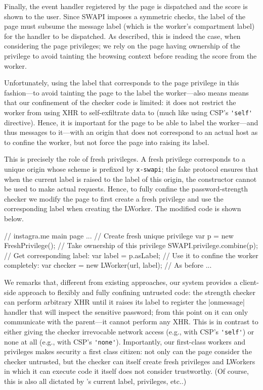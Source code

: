 Finally, the event handler registered by the page is dispatched and
the score is shown to the user.
%
Since SWAPI imposes a symmetric checks, the label of the page must
subsume the message label (which is the worker's compartment label)
for the handler to be dispatched.
%
As described, this is indeed the case, when considering the page
privileges;
%
we rely on the page having ownership of the 
privilege to avoid tainting the browsing context before reading the
score from the worker.

%
Unfortunately, using the label that corresponds to the page privilege
in this fashion---to avoid tainting the page to the label the
worker---also means means that our confinement of the checker code is
limited: it does not restrict the worker from using XHR to
self-exfiltrate data to  (much like using CSP's
\verb|'self'| directive).
%
Hence, it is important for the page to be able to label the
worker---and thus messages to it---with an origin that does not
correspond to an actual host as to confine the worker, but not force
the page into raising its label.

This is precisely the role of fresh privileges.
%
A fresh privilege corresponds to a unique origin whose scheme is
prefixed by \texttt{x-swapi}; the fake protocol ensures that when the
current label is raised to the label of this origin, the \xhr{}
constructor cannot be used to make actual requests.
%
Hence, to fully confine the password-strength checker we modify the
 page to first create a fresh privilege and use the
corresponding label when creating the LWorker.
%
The modified code is shown below.
\begin{jscode}
// instagra.me main page ...
// Create fresh unique privilege
var p = new FreshPrivilege();
// Take ownership of this privilege
SWAPI.privilege.combine(p);
// Get corresponding label:
var label = p.asLabel;
// Use it to confine the worker completely:
var checker = new LWorker(url, label);
// As before ...
\end{jscode}

We remarks that, different from existing approaches, our system
provides a client-side approach to flexibly and fully confining
untrusted code:
%
the strength checker can perform arbitrary XHR until it raises its
label to register the \js|onmessage| handler that will inspect the
sensitive password; from this point on it can only communicate with
the parent---it cannot perform any XHR.
%
This is in contrast to either giving the checker irrevocable network
access (e.g., with CSP's \verb|'self'|) or none at all (e.g., with
CSP's \verb|'none'|).
%
Importantly, our first-class workers and privileges makes security a
first class citizen: not only can the page consider the checker
untrusted, but the checker can itself create fresh privileges and 
LWorkers in which it can execute code it itself does not consider
trustworthy.
%
(Of course, this is also all dictated by \sys{}'s current label,
privileges, etc..)

